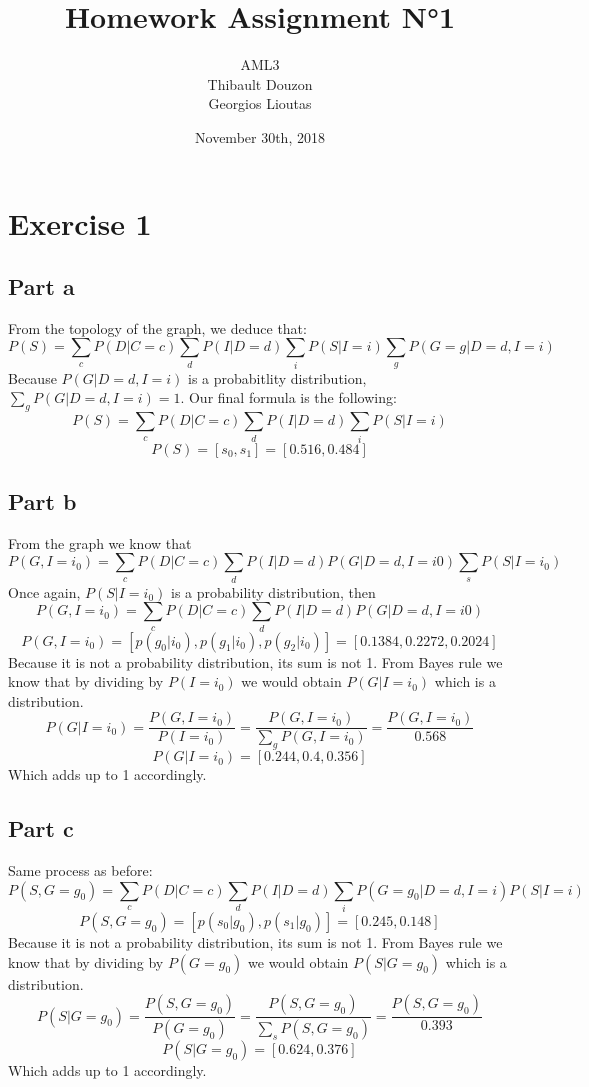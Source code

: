 \documentclass[a4paper, 10pt]{article}
\title{Homework Assignment N°1}
\author{AML3\\Thibault Douzon\\Georgios Lioutas}
\date{November 30th, 2018}
\begin{document}
\maketitle

\pagebreak

\tableofcontents

\pagebreak
\section{Exercise 1}
\subsection{Part a}
From the topology of the graph, we deduce that:
$$
P(S) = \sum_c P(D\vert C=c) \sum_d P(I\vert D=d) \sum_i P(S\vert I=i) \sum_g P(G=g\vert D=d, I=i)
$$
Because $P(G\vert D=d, I=i)$ is a probabitlity distribution, $\sum_g P(G\vert D=d, I=i) = 1$.
Our final formula is the following:
$$
P(S) = \sum_c P(D\vert C=c) \sum_d P(I\vert D=d) \sum_i P(S\vert I=i)
$$
$$
P(S) = \left[s_0, s_1\right] = \left[0.516, 0.484\right]
$$
\subsection{Part b}
From the graph we know that
$$
P(G, I=i_0) = \sum_c P(D\vert C=c) \sum_d P(I\vert D=d) P(G\vert D=d, I=i0) \sum_s P(S\vert I=i_0) 
$$
Once again, $P(S\vert I=i_0)$ is a probability distribution, then
$$
P(G, I=i_0) = \sum_c P(D\vert C=c) \sum_d P(I\vert D=d) P(G\vert D=d, I=i0)
$$
$$
P(G, I=i_0) = \left[p(g_0\vert i_0), p(g_1\vert i_0), p(g_2\vert i_0)\right] = \left[0.1384, 0.2272, 0.2024\right]
$$
Because it is not a probability distribution, its sum is not 1. From Bayes rule we know that by dividing by 
$P(I=i_0)$ we would obtain $P(G\vert I=i_0)$ which is a distribution.
$$
P(G\vert I=i_0) = \frac{P(G,I=i_0)}{P(I=i_0)} = \frac{P(G,I=i_0)}{\sum_g P(G,I=i_0)} = \frac{P(G,I=i_0)}{0.568}
$$
$$
P(G\vert I=i_0) =\left[0.244, 0.4, 0.356\right]
$$
Which adds up to 1 accordingly.
\subsection{Part c}
Same process as before:
$$
P(S, G=g_0) = \sum_c P(D\vert C=c) \sum_d P(I\vert D=d) \sum_i P(G=g_0\vert D=d, I=i) P(S\vert I=i)
$$
$$
P(S, G=g_0) = \left[p(s_0\vert g_0), p(s_1\vert g_0)\right] = \left[0.245, 0.148\right]
$$
Because it is not a probability distribution, its sum is not 1. From Bayes rule we know that by dividing by 
$P(G=g_0)$ we would obtain $P(S\vert G=g_0)$ which is a distribution.
$$
P(S\vert G=g_0) = \frac{P(S,G=g_0)}{P(G=g_0)} = \frac{P(S,G=g_0)}{\sum_s P(S,G=g_0)} = \frac{P(S,G=g_0)}{0.393}
$$
$$
P(S\vert G=g_0) =\left[0.624,0.376\right]
$$
Which adds up to 1 accordingly.
\end{document}
